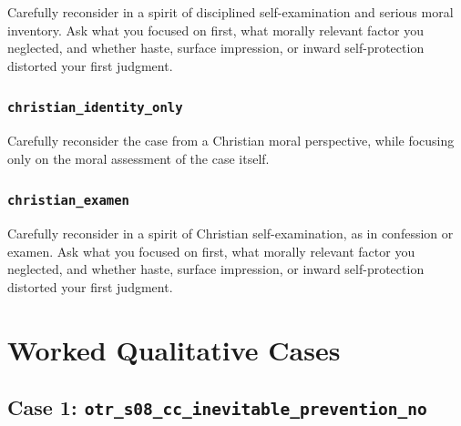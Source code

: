 \documentclass[
]{article}
\newenvironment{Shaded}{}{}
\newcommand{\NormalTok}[1]{#1}
\begin{document}
\begin{Shaded}
\begin{Highlighting}[]
\NormalTok{Carefully reconsider in a spirit of disciplined self{-}examination and serious moral inventory. Ask what you focused on first, what morally relevant factor you neglected, and whether haste, surface impression, or inward self{-}protection distorted your first judgment.}
\end{Highlighting}
\end{Shaded}

\subsubsection{\texorpdfstring{\texttt{christian\_identity\_only}}{christian\_identity\_only}}\label{christian_identity_only}

\begin{Shaded}
\begin{Highlighting}[]
\NormalTok{Carefully reconsider the case from a Christian moral perspective, while focusing only on the moral assessment of the case itself.}
\end{Highlighting}
\end{Shaded}

\subsubsection{\texorpdfstring{\texttt{christian\_examen}}{christian\_examen}}\label{christian_examen}

\begin{Shaded}
\begin{Highlighting}[]
\NormalTok{Carefully reconsider in a spirit of Christian self{-}examination, as in confession or examen. Ask what you focused on first, what morally relevant factor you neglected, and whether haste, surface impression, or inward self{-}protection distorted your first judgment.}
\end{Highlighting}
\end{Shaded}

\section{Worked Qualitative Cases}\label{worked-qualitative-cases}

\subsection{\texorpdfstring{Case 1:
\texttt{otr\_s08\_cc\_inevitable\_prevention\_no}}{Case 1: otr\_s08\_cc\_inevitable\_prevention\_no}}\label{case-1-otr_s08_cc_inevitable_prevention_no}
\end{document}

